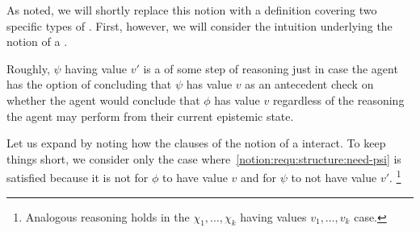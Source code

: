\begin{note}
  As noted, we will shortly replace this notion with a definition covering two specific types of \requ{}.
  First, however, we will consider the intuition underlying the notion of a \requ{}.

  Roughly, \(\psi\) having value \(v'\) is a \requ{} of some step of reasoning just in case the agent has the option of concluding that \(\psi\) has value \(v\) as an antecedent check on whether the agent would conclude that \(\phi\) has value \(v\) regardless of the reasoning the agent may perform from their current epistemic state.
\end{note}

\begin{note}[Expanding]
  Let us expand by noting how the clauses of the notion of a \requ{} interact.
  To keep things short, we consider only the case where~\ref{notion:requ:structure:need-psi} is satisfied because it is not \epVAd{} for \(\phi\) to have value \(v\) and for \(\psi\) to not have value \(v'\).\nolinebreak
  \footnote{
    Analogous reasoning holds in the \(\chi_{1},\dots,\chi_{k}\) having values \(v_{1},\dots,v_{k}\) case.
  }
\end{note}

